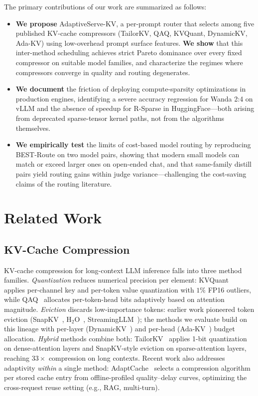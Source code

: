 \documentclass[10pt, conference]{IEEEtran}
\begin{document}
The primary contributions of our work are summarized as follows:
\begin{itemize}
    \item \textbf{We propose} AdaptiveServe-KV, a per-prompt router that selects among five published KV-cache compressors (TailorKV, QAQ, KVQuant, DynamicKV, Ada-KV) using low-overhead prompt surface features. \textbf{We show} that this inter-method scheduling achieves strict Pareto dominance over every fixed compressor on suitable model families, and characterize the regimes where compressors converge in quality and routing degenerates.
    \item \textbf{We document} the friction of deploying compute-sparsity optimizations in production engines, identifying a severe accuracy regression for Wanda 2:4 on vLLM and the absence of speedup for R-Sparse in HuggingFace---both arising from deprecated sparse-tensor kernel paths, not from the algorithms themselves.
    \item \textbf{We empirically test} the limits of cost-based model routing by reproducing BEST-Route on two model pairs, showing that modern small models can match or exceed larger ones on open-ended chat, and that same-family distill pairs yield routing gains within judge variance---challenging the cost-saving claims of the routing literature.
\end{itemize}

\section{Related Work}

\subsection{KV-Cache Compression}\label{sec:related-kv}
KV-cache compression for long-context LLM inference falls into three method families.
\textit{Quantization} reduces numerical precision per element: KVQuant~\cite{hooper2024kvquant} applies per-channel key and per-token value quantization with $1\%$ FP16 outliers, while QAQ~\cite{dong2024qaq} allocates per-token-head bits adaptively based on attention magnitude.
\textit{Eviction} discards low-importance tokens: earlier work pioneered token eviction (SnapKV~\cite{li2024snapkv}, H$_2$O~\cite{zhang2023h2o}, StreamingLLM~\cite{xiao2024streamingllm}); the methods we evaluate build on this lineage with per-layer (DynamicKV~\cite{zhou2024dynamickv}) and per-head (Ada-KV~\cite{feng2024adakv}) budget allocation.
\textit{Hybrid} methods combine both: TailorKV~\cite{yao2025tailorkv} applies 1-bit quantization on dense-attention layers and SnapKV-style eviction on sparse-attention layers, reaching $33\times$ compression on long contexts.
Recent work also addresses adaptivity \textit{within} a single method: AdaptCache~\cite{feng2025adaptcache} selects a compression algorithm per stored cache entry from offline-profiled quality--delay curves, optimizing the cross-request reuse setting (e.g., RAG, multi-turn).
\end{document}
